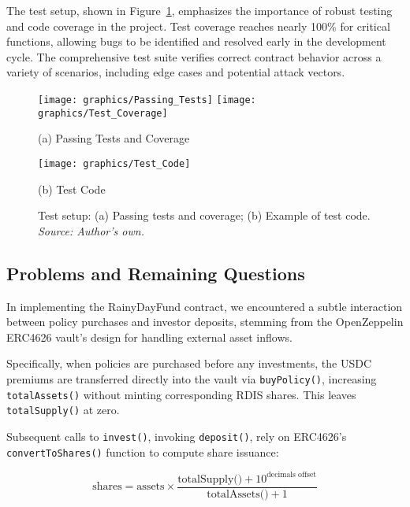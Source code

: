 \documentclass[11pt,a4paper]{article}
\begin{document}
		The test setup, shown in Figure~\ref{fig:test-set-up}, emphasizes the importance of robust testing and code coverage in the project. 
		Test coverage reaches nearly 100\% for critical functions, allowing bugs to be identified and resolved early in the development cycle. 
		The comprehensive test suite verifies correct contract behavior across a variety of scenarios, including edge cases and potential attack vectors. 

		\begin{figure}[H]
			\centering
			\begin{minipage}[b]{0.48\textwidth}
				\centering
				\texttt{[image: graphics/Passing\_Tests]}
				\texttt{[image: graphics/Test\_Coverage]}
				\caption*{(a) Passing Tests and Coverage}
			\end{minipage}\hfill
			\begin{minipage}[b]{0.48\textwidth}
				\centering
				\texttt{[image: graphics/Test\_Code]}
				\caption*{(b) Test Code}
			\end{minipage}
			\caption{Test setup: (a) Passing tests and coverage; (b) Example of test code. \\ \textit{Source: Author's own.}}
			\label{fig:test-set-up}
		\end{figure}

        \subsection{Problems and Remaining Questions}\label{subsec:problems-and-remaining-questions}

        In implementing the RainyDayFund contract, we encountered a subtle interaction between policy purchases and investor deposits, stemming from the OpenZeppelin ERC4626 vault's design for handling external asset inflows.

        Specifically, when policies are purchased before any investments, the USDC premiums are transferred directly into the vault via \texttt{buyPolicy()}, increasing \texttt{totalAssets()} without minting corresponding RDIS shares.
        This leaves \texttt{totalSupply()} at zero.

        Subsequent calls to \texttt{invest()}, invoking \texttt{deposit()}, rely on ERC4626's \texttt{convertToShares()} function to compute share issuance:

        \[
            \text{shares} = \text{assets} \times \frac{\text{totalSupply()} + 10^{\text{decimals offset}}}{\text{totalAssets()} + 1}
        \]
\end{document}
